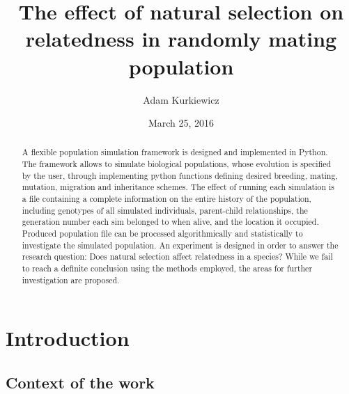 \documentclass{l4proj}
\begin{document}
\title{The effect of natural selection on relatedness in randomly mating population}
\author{Adam Kurkiewicz}
\date{March 25, 2016}
\maketitle


\begin{abstract}

A flexible population simulation framework is designed and implemented in Python. The framework allows to simulate biological populations, whose evolution is specified by the user, through implementing python functions defining desired breeding, mating, mutation, migration and inheritance schemes. The effect of running each simulation is a file containing a complete information on the entire history of the population, including genotypes of all simulated individuals, parent-child relationships, the generation number each sim belonged to when alive, and the location it occupied. Produced population file can be processed algorithmically and statistically to investigate the simulated population. An experiment is designed in order to answer the research question: Does natural selection affect relatedness in a species? While we fail to reach a definite conclusion using the methods employed, the areas for further investigation are proposed.

\end{abstract}

\educationalconsent

\tableofcontents


\chapter{Introduction}
\label{intro}


\section{Context of the work}
\end{document}
